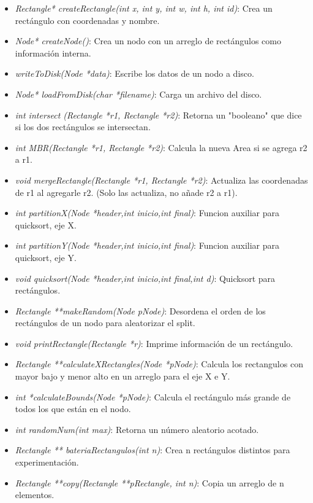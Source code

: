 \documentclass[letterpaper,10pt]{article}
\begin{document}
	\begin{itemize}
		\item \textit{Rectangle* createRectangle(int x, int y, int w, int h, int id)}: Crea un rectángulo con coordenadas y nombre.
		\item \textit{Node* createNode()}: Crea un nodo con un arreglo de rectángulos como información interna.
		\item \textit{writeToDisk(Node *data)}: Escribe los datos de un nodo a disco.
		\item \textit{Node* loadFromDisk(char *filename)}: Carga un archivo del disco.
		\item \textit{int intersect (Rectangle *r1, Rectangle *r2)}: Retorna un "booleano" que dice si los dos rectángulos se intersectan.
		\item \textit{int MBR(Rectangle *r1, Rectangle *r2)}: Calcula la nueva Area si se agrega r2 a r1.
		\item \textit{void mergeRectangle(Rectangle *r1, Rectangle *r2)}: Actualiza las coordenadas de r1 al agregarle r2. (Solo las actualiza, no añade r2 a r1).
		\item \textit{int partitionX(Node *header,int inicio,int final)}: Funcion auxiliar para quicksort, eje X.
		\item \textit{int partitionY(Node *header,int inicio,int final)}: Funcion auxiliar para quicksort, eje Y.
		\item \textit{void quicksort(Node *header,int inicio,int final,int d)}: Quicksort para rectángulos.
		\item \textit{Rectangle **makeRandom(Node pNode)}: Desordena el orden de los rectángulos de un nodo para aleatorizar el split.
		\item \textit{void printRectangle(Rectangle *r)}: Imprime información de un rectángulo.
		\item \textit{Rectangle **calculateXRectangles(Node *pNode)}: Calcula los rectangulos con mayor bajo y menor alto en un arreglo para el eje X e Y.
		\item \textit{int *calculateBounds(Node *pNode)}: Calcula el rectángulo más grande de todos los que están en el nodo.
		\item \textit{int randomNum(int max)}: Retorna un número aleatorio acotado.
		\item \textit{Rectangle ** bateriaRectangulos(int n)}: Crea n rectángulos distintos para experimentación.
		\item \textit{Rectangle **copy(Rectangle **pRectangle, int n)}: Copia un arreglo de n elementos.

\end{itemize}
\end{document}

